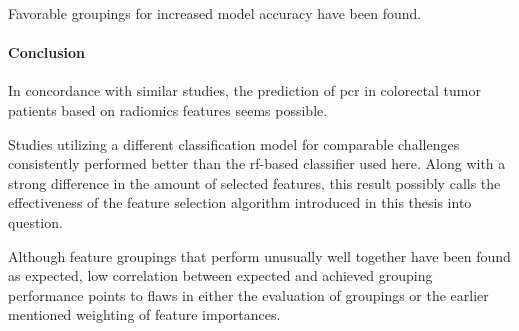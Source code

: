 Favorable groupings for increased model accuracy have been found.

\paragraph{Conclusion} In concordance with similar studies, the prediction of 
\acs{pcr} in colorectal tumor patients based on radiomics features seems 
possible.

Studies utilizing a different classification model for comparable challenges 
consistently performed better than the \acs{rf}-based classifier used here. 
Along with a strong difference in the amount of selected features, this result
possibly calls the effectiveness of the feature selection algorithm introduced 
in this thesis into question.

Although feature groupings that perform unusually well together have been found
as expected, low correlation between expected and achieved grouping performance
points to flaws in either the evaluation of groupings or the earlier mentioned 
weighting of feature importances.